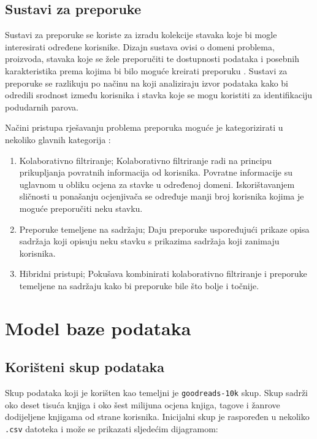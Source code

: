 \documentclass[]{foi}
\begin{document}
\section{Sustavi za preporuke}

Sustavi za preporuke se koriste za izradu kolekcije stavaka koje bi mogle interesirati određene korisnike.
Dizajn sustava ovisi o domeni problema, proizvoda, stavaka koje se žele preporučiti te dostupnosti podataka i posebnih
karakteristika prema kojima bi bilo moguće kreirati preporuku \cite{melville2010recommender}.
Sustavi za preporuke se razlikuju po načinu na koji analiziraju izvor podataka kako bi odredili
srodnost između korisnika i stavka koje se mogu koristiti za identifikaciju podudarnih parova.

Načini pristupa rješavanju problema preporuka moguće je kategorizirati u nekoliko glavnih kategorija \cite{lu2012recommender}:
\begin{enumerate}
	\item Kolaborativno filtriranje; Kolaborativno filtriranje radi na principu prikupljanja povratnih informacija od korisnika.
	      Povratne informacije su uglavnom u obliku ocjena za stavke u određenoj domeni. Iskorištavanjem sličnosti u ponašanju
	      ocjenjivača se određuje manji broj korisnika kojima je moguće preporučiti neku stavku.
	\item Preporuke temeljene na sadržaju; Daju preporuke uspoređujući prikaze opisa sadržaja koji opisuju neku stavku s
	      prikazima sadržaja koji zanimaju korisnika.
	\item Hibridni pristupi; Pokušava kombinirati kolaborativno filtriranje i preporuke temeljene na sadržaju kako bi
	      preporuke bile što bolje i točnije.
\end{enumerate}

\chapter{Model baze podataka} \label{cha:model_baze_podataka}

\section{Korišteni skup podataka}

Skup podataka koji je korišten kao temeljni je \texttt{goodreads-10k} skup. Skup sadrži oko deset tisuća knjiga i oko šest milijuna ocjena
knjiga, tagove i žanrove dodijeljene knjigama od strane korisnika. Inicijalni skup je raspoređen u nekoliko \texttt{.csv} datoteka i može
se prikazati sljedećim dijagramom:
\end{document}
